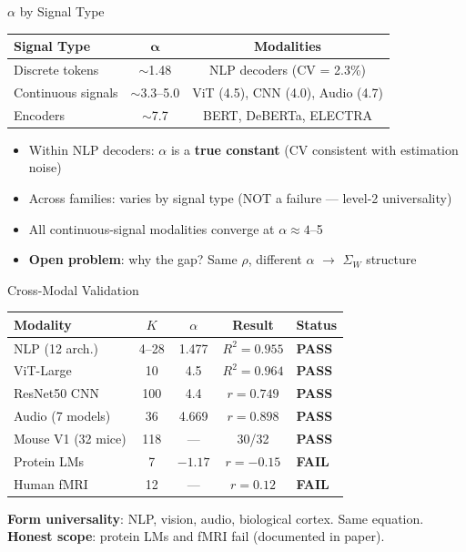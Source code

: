\documentclass[aspectratio=169,14pt]{beamer}
\begin{document}
\begin{frame}{$\alpha$ by Signal Type}
\begin{center}
\begin{tabular}{lcc}
\toprule
\textbf{Signal Type} & $\boldsymbol{\alpha}$ & \textbf{Modalities} \\
\midrule
Discrete tokens & $\sim$1.48 & NLP decoders (CV = 2.3\%) \\
Continuous signals & $\sim$3.3--5.0 & ViT (4.5), CNN (4.0), Audio (4.7) \\
Encoders & $\sim$7.7 & BERT, DeBERTa, ELECTRA \\
\bottomrule
\end{tabular}
\end{center}

\vspace{0.5cm}
\begin{itemize}
\item Within NLP decoders: $\alpha$ is a \textbf{true constant} (CV consistent with estimation noise)
\item Across families: varies by signal type (NOT a failure --- level-2 universality)
\item All continuous-signal modalities converge at $\alpha \approx 4$--5
\item \textbf{Open problem}: why the gap? Same $\rho$, different $\alpha$ $\to$ $\Sigma_W$ structure
\end{itemize}
\end{frame}

\begin{frame}{Cross-Modal Validation}
\begin{center}
\small
\begin{tabular}{lcccl}
\toprule
\textbf{Modality} & $K$ & $\alpha$ & Result & Status \\
\midrule
NLP (12 arch.) & 4--28 & 1.477 & $R^2 = 0.955$ & \textcolor{ctigreen}{\textbf{PASS}} \\
ViT-Large & 10 & 4.5 & $R^2 = 0.964$ & \textcolor{ctigreen}{\textbf{PASS}} \\
ResNet50 CNN & 100 & 4.4 & $r = 0.749$ & \textcolor{ctigreen}{\textbf{PASS}} \\
Audio (7 models) & 36 & 4.669 & $r = 0.898$ & \textcolor{ctigreen}{\textbf{PASS}} \\
Mouse V1 (32 mice) & 118 & --- & 30/32 & \textcolor{ctigreen}{\textbf{PASS}} \\
\midrule
Protein LMs & 7 & $-1.17$ & $r = -0.15$ & \textcolor{ctired}{\textbf{FAIL}} \\
Human fMRI & 12 & --- & $r = 0.12$ & \textcolor{ctired}{\textbf{FAIL}} \\
\bottomrule
\end{tabular}
\end{center}

\vspace{0.3cm}
\textbf{Form universality}: NLP, vision, audio, biological cortex. Same equation.\\
\textbf{Honest scope}: protein LMs and fMRI fail (documented in paper).
\end{frame}
\end{document}
